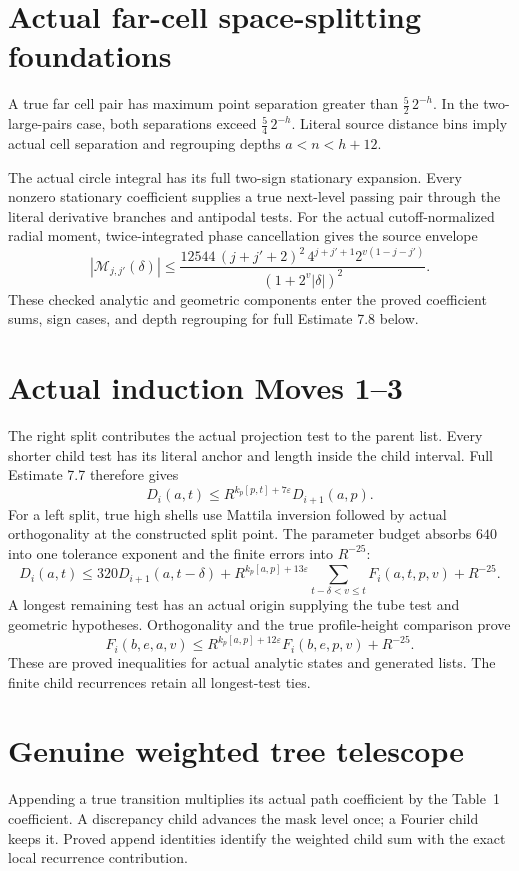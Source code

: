 \documentclass[11pt]{article}
\begin{document}
\newpage
\section*{Actual far-cell space-splitting foundations}
A true far cell pair has maximum point separation greater than
$\tfrac52\,2^{-h}$. In the two-large-pairs case, both separations exceed
$\tfrac54\,2^{-h}$. Literal source distance bins imply actual cell separation
and regrouping depths $a<n<h+12$.

The actual circle integral has its full two-sign stationary expansion.
Every nonzero stationary coefficient supplies a true next-level passing
pair through the literal derivative branches and antipodal tests.
For the actual cutoff-normalized radial moment, twice-integrated phase
cancellation gives the source envelope
\[
|\mathcal M_{j,j'}(\delta)|\le
\frac{12544\,(j+j'+2)^2\,4^{j+j'+1}
2^{v(1-j-j')}}{(1+2^v|\delta|)^2}.
\]
These checked analytic and geometric components enter the proved coefficient
sums, sign cases, and depth regrouping for full Estimate 7.8 below.

\newpage
\section*{Actual induction Moves 1--3}
The right split contributes the actual projection test to the parent list.
Every shorter child test has its literal anchor and length inside the child
interval. Full Estimate 7.7 therefore gives
\[
D_i(a,t)\le R^{k_p[p,t]+7\varepsilon}D_{i+1}(a,p).
\]
For a left split, true high shells use Mattila inversion followed by actual
orthogonality at the constructed split point. The parameter budget absorbs
$640$ into one tolerance exponent and the finite errors into $R^{-25}$:
\[
D_i(a,t)\le320D_{i+1}(a,t-\delta)
+R^{k_p[a,p]+13\varepsilon}\sum_{t-\delta<v\le t}F_i(a,t,p,v)+R^{-25}.
\]
A longest remaining test has an actual origin supplying the tube test and
geometric hypotheses. Orthogonality and the true profile-height comparison
prove
\[
F_i(b,e,a,v)\le R^{k_p[a,p]+12\varepsilon}F_i(b,e,p,v)+R^{-25}.
\]
These are proved inequalities for actual analytic states and generated lists.
The finite child recurrences retain all longest-test ties.

\newpage
\section*{Genuine weighted tree telescope}
Appending a true transition multiplies its actual path coefficient by the
Table~1 coefficient. A discrepancy child advances the mask level once;
a Fourier child keeps it. Proved append identities identify the weighted
child sum with the exact local recurrence contribution.
\end{document}
